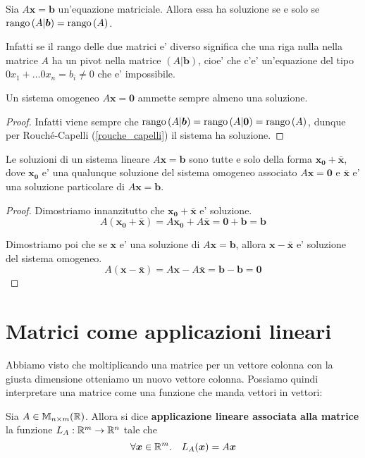 \begin{theorem} \label{rouche_capelli}
    Sia $A\bm{x} = \bm b$ un'equazione matriciale. Allora essa ha soluzione se e solo se $\operatorname{rango}\left( A|\bm b \right) = \operatorname{rango}\left( A \right)$.
\end{theorem}
\begin{intuition}
    Infatti se il rango delle due matrici e' diverso significa che una riga nulla nella matrice $A$ ha un pivot nella matrice $(A|\bm b)$, cioe' che c'e' un'equazione del tipo $0x_1 + \dots 0x_n = b_i \neq 0$ che e' impossibile.
\end{intuition}

\begin{proposition}
    Un sistema omogeneo $A\bm{x} = \bm 0$ ammette sempre almeno una soluzione.
\end{proposition}
\begin{proof}
    Infatti viene sempre che $\operatorname{rango}\left( A|\bm b \right) = \operatorname{rango}\left( A|\bm 0 \right) = \operatorname{rango}\left( A \right)$, dunque per Rouché-Capelli (\ref{rouche_capelli}) il sistema ha soluzione.
\end{proof}

\begin{proposition}
    Le soluzioni di un sistema lineare $A\bm x = \bm b$ sono tutte e solo della forma $\bm{x_0} + \bm{\bar{x}}$, dove $\bm{x_0}$ e' una qualunque soluzione del sistema omogeneo associato $A\bm x = \bm 0$ e $\bm{\bar{x}}$ e' una soluzione particolare di $A\bm x = \bm b$.
\end{proposition}
\begin{proof}
    Dimostriamo innanzitutto che $\bm{x_0} + \bm{\bar{x}}$ e' soluzione.
    \[A(\bm{x_0} + \bm{\bar{x}}) = A\bm{x_0} + A\bm{\bar{x}} = \bm 0 + \bm b = \bm b\]

    Dimostriamo poi che se $\bm x$ e' una soluzione di $A\bm x = \bm b$, allora $\bm x - \bm{\bar x}$ e' soluzione del sistema omogeneo.
    \[A(\bm{x} - \bm{\bar{x}}) = A\bm{x} - A\bm{\bar{x}} = \bm b - \bm b = \bm 0\]
\end{proof}

\section{Matrici come applicazioni lineari}

Abbiamo visto che moltiplicando una matrice per un vettore colonna con la giusta dimensione otteniamo un nuovo vettore colonna. Possiamo quindi interpretare una matrice come una funzione che manda vettori in vettori:
\begin{definition}
    Sia $A \in \mathbb{M}_{n \times m}(\mathbb{R})$. Allora si dice \textbf{applicazione lineare associata alla matrice} la funzione $L_A : \mathbb{R}^m \to \mathbb{R}^n$ tale che \begin{equation}
        \forall \bm x \in \mathbb{R}^m. \quad L_A(\bm x) = A \bm x
    \end{equation}
\end{definition}

